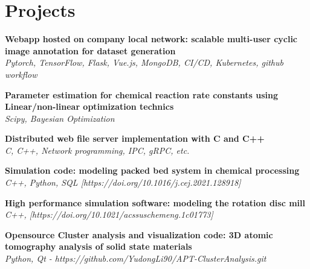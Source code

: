 \section{Projects}
\resumeSubHeadingListStart

    \resumeProjectHeading
    {\textbf{Webapp hosted on company local network: scalable multi-user cyclic image annotation for dataset generation} \\
     \emph{Pytorch, TensorFlow, Flask, Vue.js, MongoDB, CI/CD, Kubernetes, github workflow}}    {}

     \resumeProjectHeading
    {\textbf{Parameter estimation for chemical reaction rate constants using Linear/non-linear optimization technics} \\
     \emph{Scipy, Bayesian Optimization}}    {}

     \resumeProjectHeading
     {\textbf{Distributed web file server implementation with C and C++} \\
      \emph{C, C++, Network programming, IPC, gRPC, etc.}}    {}
     
    \resumeProjectHeading
    {\textbf{Simulation code: modeling packed bed system in chemical processing} \\
     \emph{C++, Python, SQL [https://doi.org/10.1016/j.cej.2021.128918]}}    {}
    
    \resumeProjectHeading
    {\textbf{High performance simulation software: modeling the rotation disc mill}\\
    \emph{C++, [https://doi.org/10.1021/acssuschemeng.1c01773]}}{}

    \resumeProjectHeading
    {\textbf{Opensource Cluster analysis and visualization code: 3D atomic tomography analysis of solid state materials}\\
    \emph{Python, Qt   - https://github.com/YudongLi90/APT-ClusterAnalysis.git}} 
    

\resumeSubHeadingListEnd